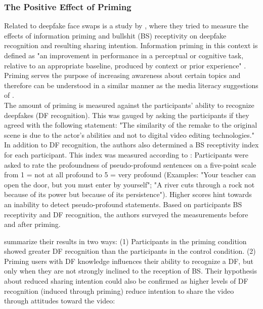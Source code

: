 \documentclass[
  a4paper,  %
  twoside,  %
  bibliography=totoc,
  headsepline,
  cleardoublepage=empty,
  parskip=half,
  draft=false
]{scrbook}
\begin{document}
\subsubsection*{The Positive Effect of Priming}
Related to deepfake face swaps is a study by \citeauthor{iacobucciDeepfakesUnmaskedEffects2021}, where they tried to measure the effects of information priming and bullshit (BS) receptivity on deepfake recognition and resulting sharing intention. Information priming in this context is defined as "an improvement in performance in a perceptual or cognitive task, relative to an appropriate baseline, produced by context or prior experience" \cite{iacobucciDeepfakesUnmaskedEffects2021}. Priming serves the purpose of increasing awareness about certain topics and therefore can be understood in a similar manner as the media literacy suggestions of \citeauthor{hwangEffectsDisinformationUsing2021}. \\
The amount of priming is measured against the participants' ability to recognize deepfakes (DF recognition). This was gauged by asking the participants if they agreed with the following statement: "The similarity of the remake to the original scene is due to the actor's abilities and not to digital video editing technologies." In addition to DF recognition, the authors also determined a BS receptivity index for each participant. This index was measured according to \cite{pennycookReceptionDetectionPseudoprofound2015}: Participants were asked to rate the profoundness of pseudo-profound sentences on a five-point scale from 1 = not at all profound to 5 = very profound (Examples: "Your teacher can open the door, but you must enter by yourself"; "A river cuts through a rock not because of its power but because of its persistence"). Higher scores hint towards an inability to detect pseudo-profound statements. Based on participants BS receptivity and DF recognition, the authors surveyed the measurements before and after priming.

\citeauthor{iacobucciDeepfakesUnmaskedEffects2021} summarize their results in two ways: (1) Participants in the priming condition showed greater DF recognition than the participants in the control condition. (2) Priming users with DF knowledge influences their ability to recognize a DF, but only when they are not strongly inclined to the reception of BS. Their hypothesis about reduced sharing intention could also be confirmed as higher levels of DF recognition (induced through priming) reduce intention to share the video through attitudes toward the video:
\end{document}
